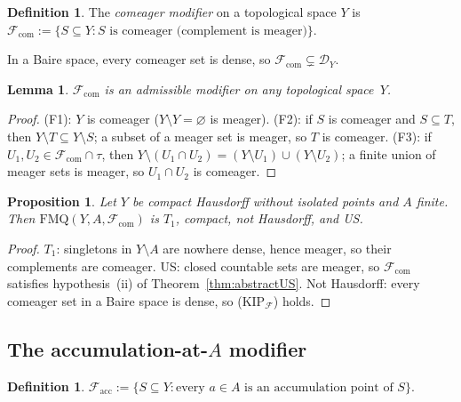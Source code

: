 \documentclass[11pt]{article}
\newtheorem{lemma}[theorem]{Lemma}
\newtheorem{proposition}[theorem]{Proposition}
\theoremstyle{definition}
\newtheorem{definition}[theorem]{Definition}
\theoremstyle{remark}
\begin{document}
\begin{definition}\label{def:comeager}
The \emph{comeager modifier} on a topological space $Y$ is
$\mathcal{F}_{\mathrm{com}} := \{S \subseteq Y : S \text{ is comeager (complement is meager)}\}$.
\end{definition}

In a Baire space, every comeager set is dense, so
$\mathcal{F}_{\mathrm{com}} \subsetneq \mathcal{D}_Y$.

\begin{lemma}\label{lem:comadmissible}
$\mathcal{F}_{\mathrm{com}}$ is an admissible modifier on any topological space~$Y$.
\end{lemma}

\begin{proof}
(F1): $Y$ is comeager ($Y \setminus Y = \varnothing$ is meager).
(F2): if $S$ is comeager and $S \subseteq T$, then $Y \setminus T \subseteq Y \setminus S$;
a subset of a meager set is meager, so $T$ is comeager.
(F3): if $U_1, U_2 \in \mathcal{F}_{\mathrm{com}} \cap \tau$, then
$Y \setminus (U_1 \cap U_2) = (Y \setminus U_1) \cup (Y \setminus U_2)$; a finite
union of meager sets is meager, so $U_1 \cap U_2$ is comeager.
\end{proof}

\begin{proposition}\label{prop:comeager}
Let $Y$ be compact Hausdorff without isolated points and $A$ finite. Then
$\mathrm{FMQ}(Y, A, \mathcal{F}_{\mathrm{com}})$ is $T_1$, compact,
not Hausdorff, and US.
\end{proposition}

\begin{proof}
$T_1$: singletons in $Y \setminus A$ are nowhere dense, hence meager,
so their complements are comeager.
US: closed countable sets are meager, so $\mathcal{F}_{\mathrm{com}}$
satisfies hypothesis~(ii) of Theorem~\ref{thm:abstractUS}.
Not Hausdorff: every comeager set in a Baire space is dense, so
\textup{(KIP$_{\mathcal{F}}$)} holds.
\end{proof}

\subsection{The accumulation-at-$A$ modifier}

\begin{definition}\label{def:accumulation}
$\mathcal{F}_{\mathrm{acc}} := \{S \subseteq Y : \text{every } a \in A
\text{ is an accumulation point of } S\}$.
\end{definition}
\end{document}
